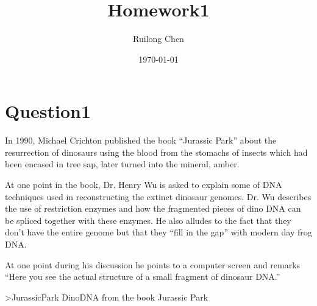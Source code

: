 \documentclass{article}
\title{Homework1}
\author{Ruilong Chen}
\date{\today}
\begin{document}
\maketitle %

\section{Question1}

In 1990, Michael Crichton published the book ``Jurassic Park'' about the resurrection of dinosaurs using the blood from the stomachs of insects which had been encased in tree sap, later turned into the mineral, amber. 

At one point in the book, Dr. Henry Wu is asked to explain some of DNA techniques used in reconstructing the extinct dinosaur genomes. Dr. Wu describes the use of restriction enzymes and how the fragmented pieces of dino DNA can be spliced together with these enzymes. He also alludes to the fact that they don't have the entire genome but that they ``fill in the gap'' with modern day frog DNA. 

At one point during his discussion he points to a computer screen and remarks ``Here you see the actual structure of a small fragment of dinosaur DNA.''

>JurassicPark DinoDNA from the book Jurassic Park
\end{document}
